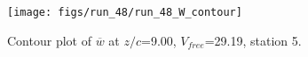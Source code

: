 \begin{figure}[H]
\centering
\texttt{[image: figs/run\_48/run\_48\_W\_contour]}
\caption{Contour plot of $\overline{w}$ at $z/c$=9.00, $V_{free}$=29.19, station 5.}
\label{fig:run_48_W_contour}
\end{figure}


